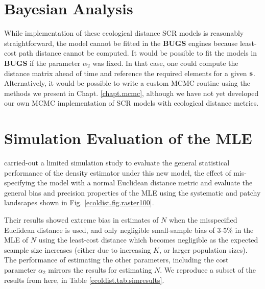 \section{Bayesian Analysis}

While implementation of these ecological distance SCR models is
reasonably straightforward, the model cannot be fitted 
in the  {\bf BUGS} engines because least-cost path distance cannot be computed.
It would be possible to fit the models
in {\bf BUGS} if the parameter $\alpha_{2}$ was fixed. In that case,
one could compute the distance matrix ahead of time and reference the
required elements for a given ${\bf s}$.
Alternatively, it would be possible to write a custom MCMC routine
using the methods we present in Chapt. \ref{chapt.mcmc}, although we
have not yet developed our own MCMC implementation of SCR models with
ecological distance metrics.


\section{Simulation Evaluation of the MLE}

\citet{royle_etal:2012ecol}
carried-out a limited simulation study to evaluate the
general statistical performance of the density estimator under
this new model, the effect of mis-specifying the model with a
normal Euclidean distance metric and evaluate the general bias and
precision properties of the MLE using the systematic and patchy
landscapes shown in 
Fig. \ref{ecoldist.fig.raster100}.

Their results showed extreme 
bias in estimates of $N$ when the misspecified Euclidean distance is
used, and only negligible small-sample 
 bias of 3-5\% in the MLE of $N$ using the
least-cost distance which becomes negligible as the expected seample
size increases (either due to increasing $K$, or larger population sizes).
The performance of estimating the other parameters, including the 
cost parameter $\alpha_{2}$ mirrors
the results for estimating $N$.
We reproduce a subset of the results from \citet{royle_etal:2012ecol}
here, in Table \ref{ecoldist.tab.simresults}.

